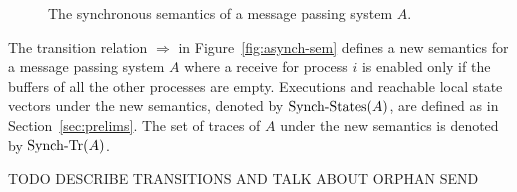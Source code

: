 \begin{figure} [t]
\footnotesize{
  \centering
  \begin{mathpar}

    
    
  \end{mathpar}
  }
  \caption{The synchronous semantics of a message passing system $A$. 
  }
  \label{fig:synch-sem}
\end{figure}

The transition relation $\Rightarrow$ in Figure~\ref{fig:asynch-sem} defines a new semantics for  a message passing system $A$
where a receive for process $i$ is enabled only if the buffers of all the other processes are empty. Executions and reachable local
state vectors under the new semantics, denoted by $\synch{States}(A)$, are defined as in Section~\ref{sec:prelims}.
The set of traces of $A$ under the new semantics is denoted by $\synch{Tr}(A)$.

TODO DESCRIBE TRANSITIONS AND TALK ABOUT ORPHAN SEND

